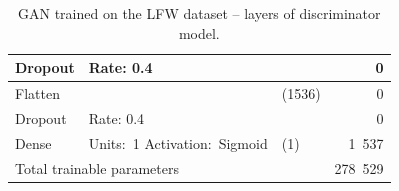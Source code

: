 \begin{table}
\begin{center}
\begin{tabular}{ |m{5em}|m{9em}|l|r| }
            \cline{1-2} \cline{4-4}
                Dropout & Rate: 0.4 & & 0 \\
            \hline
                Flatten & & (1536) & 0 \\
            \hline
                Dropout & Rate: 0.4 & & 0 \\
            \hline
                Dense & \mbox{Units: 1} \mbox{Activation: Sigmoid} & (1) & 1~537 \\
            \hline
            \hline
                \multicolumn{3}{|l|}{Total trainable parameters} & 278~529 \\
            \hline
        \end{tabular}
    \end{center}
    \caption{\label{tab:gan-lfw-discriminator}GAN trained on the LFW dataset – layers of discriminator model.}
\end{table}

